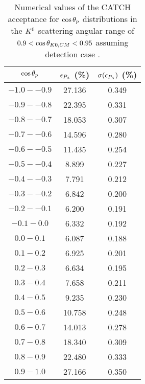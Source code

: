 \begin{table}[!h] 
  \begin{center}
  \caption{Numerical values of the CATCH acceptance for $\cos{\theta_p}$ distributions in the $K^{0}$ scattering angular range of \textbf{$0.9<\cos{\theta_{K0,CM}}<0.95$} assuming detection case .}
  \centering
  \begin{threeparttable}
    \begin{tabular}{ccc}
    $\cos{\theta_p}$ & $\epsilon_{P_{\Lambda}}$ (\%) & $\sigma(\epsilon_{P_{\Lambda}})$ (\%) \\
    \midrule\midrule
    $-1.0 - -0.9$ & 27.136 & 0.349 \\
    \midrule
    $-0.9 - -0.8$ & 22.395 & 0.331 \\
    \midrule
    $-0.8 - -0.7$ & 18.053 & 0.307 \\
    \midrule
    $-0.7 - -0.6$ & 14.596 & 0.280 \\
    \midrule
    $-0.6 - -0.5$ & 11.435 & 0.254 \\
    \midrule
    $-0.5 - -0.4$ & 8.899 & 0.227 \\
    \midrule
    $-0.4 - -0.3$ & 7.791 & 0.212 \\
    \midrule
    $-0.3 - -0.2$ & 6.842 & 0.200 \\
    \midrule
    $-0.2 - -0.1$ & 6.200 & 0.191 \\
    \midrule
    $-0.1 - 0.0$ & 6.332 & 0.192 \\
    \midrule
    $0.0 - 0.1$ & 6.087 & 0.188 \\
    \midrule
    $0.1 - 0.2$ & 6.925 & 0.201 \\
    \midrule
    $0.2 - 0.3$ & 6.634 & 0.195 \\
    \midrule
    $0.3 - 0.4$ & 7.658 & 0.211 \\
    \midrule
    $0.4 - 0.5$ & 9.235 & 0.230 \\
    \midrule
    $0.5 - 0.6$ & 10.758 & 0.248 \\
    \midrule
    $0.6 - 0.7$ & 14.013 & 0.278 \\
    \midrule
    $0.7 - 0.8$ & 18.340 & 0.309 \\
    \midrule
    $0.8 - 0.9$ & 22.480 & 0.333 \\
    \midrule
    $0.9 - 1.0$ & 27.166 & 0.350 \\
    \end{tabular}
  \end{threeparttable}
  \label{tab-Pl-acc_38}
  \end{center}
\end{table}


